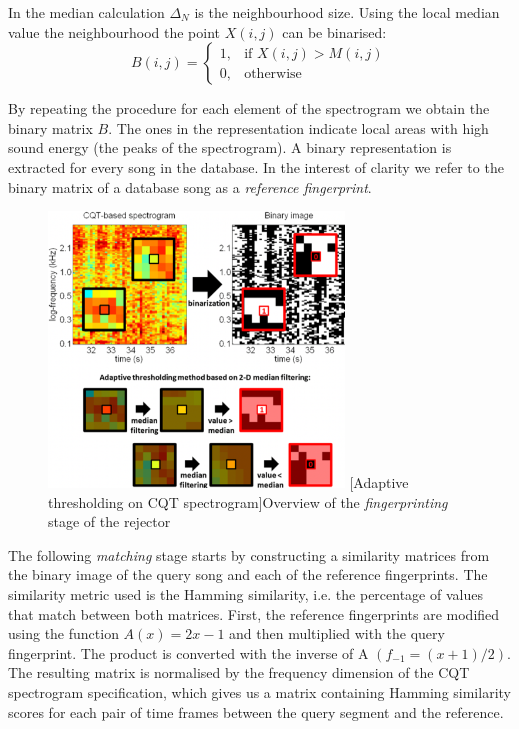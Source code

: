 In the median calculation $\Delta_N$ is the neighbourhood size. Using the local
median value the neighbourhood the point $X(i, j)$ can be binarised:
\begin{equation}
    B(i, j) = \begin{cases}
        1,& \text{if } X(i, j) > M(i, j) \\
        0,& \text{otherwise}
    \end{cases}
\end{equation}

By repeating the procedure for each element of the spectrogram we obtain the
binary matrix $B$. The ones in the representation indicate local areas with high
sound energy (the peaks of the spectrogram). A binary representation is
extracted for every song in the database. In the interest of clarity we refer to
the binary matrix of a database song as a \textit{reference fingerprint}. 

\begin{figure}[H]
   \centering
   \includegraphics[width=0.7\textwidth]{Algorithms/adaptivethresh.png} 
   [Adaptive thresholding on CQT spectrogram]{Overview of the \textit{fingerprinting} stage of the rejector \cite{rafii2014audio}}
\end{figure}

The following \textit{matching} stage starts by constructing a similarity
matrices from the binary image of the query song and each of the reference
fingerprints. The similarity metric used is the Hamming similarity, i.e. the
percentage of values that match between both matrices. First, the reference
fingerprints are modified using the function $A(x) = 2x - 1$ and then multiplied
with the query fingerprint. The product is converted with the inverse of A
$(f_{-1} = (x + 1)/2)$. The resulting matrix is normalised by the frequency
dimension of the CQT spectrogram specification, which gives us a matrix
containing Hamming similarity scores for each pair of time frames between the
query segment and the reference.

